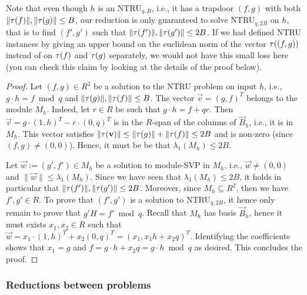 Note that even though $h$ is an NTRU$_{q,B}$, i.e., it has a trapdoor $(f,g)$ with both $\|\tau(f)\|, \|\tau(g)\| \leq B$, our reduction is only guaranteed to solve NTRU$_{q,2B}$ on $h$, that is to find $(f',g')$ such that $\|\tau(f')\|, \|\tau(g')\| \leq 2B$. If we had defined NTRU instances by giving an upper bound on the euclidean norm of the vector $\tau((f,g))$ instead of  on $\tau(f)$ and $\tau(g)$ separately, we would not have this small loss here (you can check this claim by looking at the details of the proof below).


\begin{proof}
Let $(f,g) \in R^2$ be a solution to the NTRU problem on input $h$, i.e., $g \cdot h = f \bmod q$ and $\|\tau(g)\|, \|\tau(f)\| \leq B$. The vector $\vec v = (g,f)^T$ belongs to the module $M_h$. Indeed, let $r \in R$ be such that $g \cdot h = f + qr$. Then $\vec v = g \cdot (1, h)^T - r \cdot (0, q)^T$ is in the $R$-span of the columns of $\vec B_h$, i.e., it is in $M_h$.
This vector satisfies $\|\tau(\mathbf v)\| \leq \|\tau(g)\| + \| \tau(f)\| \leq 2B$ and is non-zero (since $(f,g) \neq (0,0)$). Hence, it must be be that $\lambda_1(M_h) \leq 2B$.

Let $\vec w := (g',f') \in M_h$ be a solution to module-SVP in $M_h$, i.e., $\vec w \neq (0,0)$ and $\|\vec w \| \leq \lambda_1(M_h)$. Since we have seen that $\lambda_1(M_h) \leq 2B$, it holds in particular that $\|\tau(f')\|, \|\tau(g')\| \leq 2B$. Moreover, since $M_h \subseteq R^2$, then we have $f', g' \in R$. To prove that $(f',g')$ is a solution to NTRU$_{q,2B}$, it hence only remain to prove that $g' H = f' \bmod q$. Recall that $M_h$ has basis $\vec B_h$, hence it must exists $x_1, x_2 \in R$ such that $\vec w = x_1 \cdot (1, h)^T + x_2 (0, q)^T = (x_1, x_1 h + x_2 q)^T$. Identifying the coefficients shows that $x_1 = g$ and $f = g \cdot h + x_2 q = g \cdot h \bmod q$ as desired. This concludes the proof.
\end{proof}



\subsubsection{Reductions between problems}

